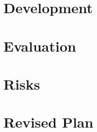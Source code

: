 \documentclass[11pt, a4paper]{article}
\begin{document}
\section{Development} %
\label{sec:development_process}



\section{Evaluation} %
\label{sec:evaluation}



\section{Risks} %
\label{sec:risks}



\section{Revised Plan} %
\label{sec:revised_plan}

\end{document}

